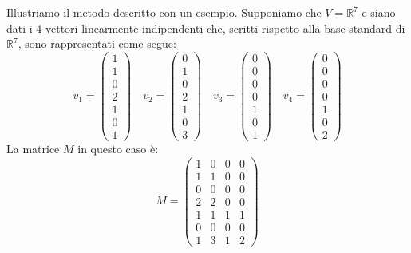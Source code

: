 \begin{example}
	Illustriamo il metodo descritto con un esempio. Supponiamo che
	$V = \mathbb{R}^7$ e siano dati i 4 vettori linearmente
	indipendenti che, scritti rispetto alla base standard di
	$\mathbb{R}^7$, sono rappresentati come segue:
	\begin{equation*}
		v_1 = \begin{pmatrix}
			1 \\ 1 \\ 0 \\ 2 \\ 1 \\ 0 \\ 1
		\end{pmatrix} \quad
		v_2 = \begin{pmatrix}
			0 \\ 1 \\ 0 \\ 2 \\ 1 \\ 0 \\ 3
		\end{pmatrix} \quad
		v_3 = \begin{pmatrix}
			0 \\ 0 \\ 0 \\ 0 \\ 1 \\ 0 \\ 1
		\end{pmatrix} \quad
		v_4 = \begin{pmatrix}
			0 \\ 0 \\ 0 \\ 0 \\ 1 \\ 0 \\ 2
		\end{pmatrix}
	\end{equation*}
	La matrice $M$ in questo caso \`e:
	\begin{equation*}
		M = \begin{pmatrix}
			1 & 0 & 0 & 0 \\
			1 & 1 & 0 & 0 \\
			0 & 0 & 0 & 0 \\
			2 & 2 & 0 & 0 \\
			1 & 1 & 1 & 1 \\
			0 & 0 & 0 & 0 \\
			1 & 3 & 1 & 2
		\end{pmatrix}
	\end{equation*}

\end{example}
